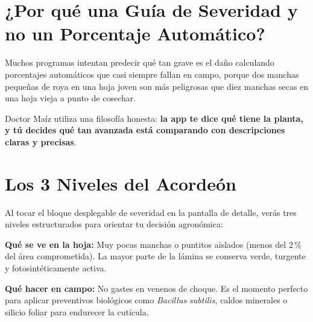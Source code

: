 \documentclass[11pt,a4paper]{report}
\begin{document}
\section{¿Por qué una Guía de Severidad y no un Porcentaje Automático?}
Muchos programas intentan predecir qué tan grave es el daño calculando porcentajes automáticos que casi siempre fallan en campo, porque dos manchas pequeñas de roya en una hoja joven son más peligrosas que diez manchas secas en una hoja vieja a punto de cosechar.

Doctor Maíz utiliza una filosofía honesta: \textbf{la app te dice qué tiene la planta, y tú decides qué tan avanzada está comparando con descripciones claras y precisas}.

\newpage

\section{Los 3 Niveles del Acordeón}
Al tocar el bloque desplegable de severidad en la pantalla de detalle, verás tres niveles estructurados para orientar tu decisión agronómica:

\vspace{1.5mm}
\begin{tcolorbox}[
    enhanced,
    colback=MaizPaleGreen!50,
    colframe=MaizPrimary,
    arc=2mm,
    boxrule=1.1pt,
    title={\textbf{Nivel 1: Apenas empieza (Leve)}},
    fonttitle=\sffamily\bfseries\color{white},
    colbacktitle=MaizPrimary,
    attach boxed title to top left={yshift=-2mm,xshift=4mm},
    boxed title style={sharp corners, rounded corners=southeast, colback=MaizPrimary},
    top=2.5mm, bottom=2.5mm, left=4mm, right=4mm
]
    \textbf{Qué se ve en la hoja:} Muy pocas manchas o puntitos aislados (menos del 2\,\% del área comprometida). La mayor parte de la lámina se conserva verde, turgente y fotosintéticamente activa.
    
    \vspace{1.5mm}
    \textbf{Qué hacer en campo:} No gastes en venenos de choque. Es el momento perfecto para aplicar preventivos biológicos como \textit{Bacillus subtilis}, caldos minerales o silicio foliar para endurecer la cutícula.
\end{tcolorbox}
\end{document}

